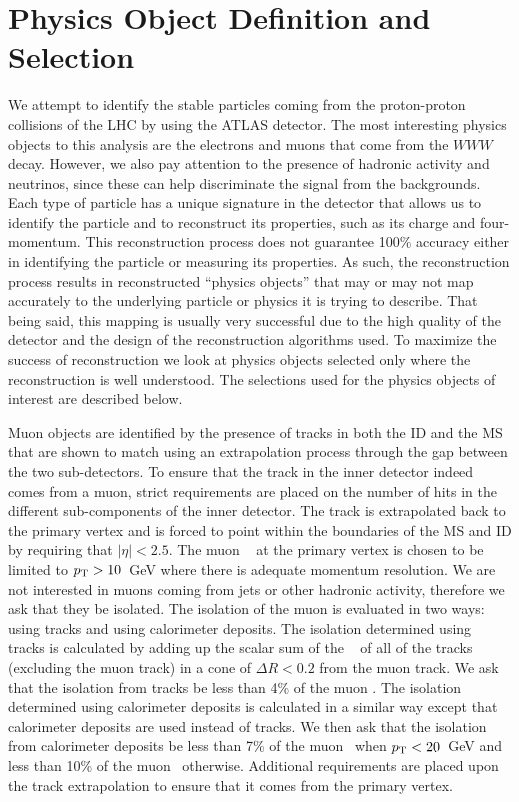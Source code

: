 \section{Physics Object Definition and Selection}
\label{sec:object_selection}
We attempt to identify the stable particles coming from
the proton-proton collisions of the LHC by using the ATLAS detector.
The most interesting physics objects
to this analysis are the electrons and muons
that come from the $WWW$ decay. However, we also pay attention to 
the presence of hadronic activity and neutrinos, since these can
help discriminate the signal from the backgrounds.
Each type of particle has a unique signature in the detector
that allows us to identify the particle and to reconstruct 
its properties, such as its charge and four-momentum. 
This reconstruction process does not guarantee
100\% accuracy either in identifying the particle or measuring its 
properties. As such, the reconstruction process results in reconstructed
``physics objects'' that may or may not map accurately 
to the underlying particle or physics it is trying to describe. That 
being said, this mapping is usually very successful due to the high quality
of the detector and the design of the reconstruction algorithms used.
To maximize the success of reconstruction we look at physics
objects selected only where the reconstruction is well understood.
The selections used for the physics objects of interest are described below.


Muon objects are identified by the presence of tracks in both 
the ID and the MS that are shown 
to match using an extrapolation process through the gap between the
two sub-detectors. To ensure that the track in the inner detector
indeed comes from a muon, strict requirements are placed
on the number of hits in the different sub-components of the inner detector.
The track is extrapolated back to the primary vertex and is forced
to point within the boundaries of the MS and ID
by requiring that $|\eta|<2.5$.
The muon \pt~ at the primary vertex is chosen to be limited to $p_{\mathrm{T}} > 10$~GeV
where there is adequate momentum resolution. We are not interested in 
muons coming from jets or other hadronic activity, therefore we
ask that they be isolated. The isolation of the muon is evaluated
in two ways: using tracks and using calorimeter deposits.
The isolation determined using tracks is calculated by adding
up the scalar sum of the \pt~ of all of the tracks (excluding
the muon track) in a cone of $\Delta R< 0.2$ from the muon track.
We ask that the isolation from tracks be less than 4\% of the muon \pt.
The isolation determined using calorimeter deposits is calculated in
a similar way except that calorimeter deposits are used instead of tracks.
We then ask that the isolation from calorimeter deposits 
be less than 7\% of the muon \pt~when $p_{\mathrm{T}} < 20$~GeV and 
less than 10\% of the muon \pt~otherwise. Additional requirements
are placed upon the track extrapolation to ensure that it comes from
the primary vertex.


